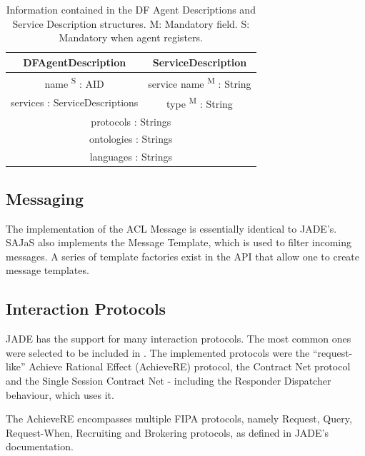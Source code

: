\begin{table}
	\normalsize
	\caption[The DF Agent Descriptions and the Service Description]{Information contained in the DF Agent Descriptions and Service Description structures.
	M: Mandatory field. S: Mandatory when agent registers.}
	\label{tab:dfAgentDescription}
	\begin{center}
		\begin{tabular}{c|c}
		\hline
		\textbf{DFAgentDescription} & \textbf{ServiceDescription} \\
		\hline
		name \textsuperscript{S} : AID & service name \textsuperscript{M} : String \\
		\hline
		services : ServiceDescriptions & type \textsuperscript{M} : String \\
		\hline
		\multicolumn{2}{c}{protocols : Strings} \\
		\hline
		\multicolumn{2}{c}{ontologies : Strings} \\
		\hline
		\multicolumn{2}{c}{languages : Strings} \\
		\hline
		\end{tabular}
	\end{center}
\end{table} 

\subsection{Messaging}
The implementation of the ACL Message is essentially identical to JADE's. SAJaS also implements the Message Template, which is used to filter incoming messages. A series of template factories exist in the API that allow one to create message templates. 

\subsection{Interaction Protocols}
JADE has the support for many interaction protocols. The most common ones were selected to be included in \apiname{}.
The implemented protocols were the ``request-like'' Achieve Rational Effect (AchieveRE) protocol, the Contract Net protocol and the Single Session Contract Net - including the Responder Dispatcher behaviour, which uses it.

The AchieveRE encompasses multiple \gls{FIPA} protocols, namely Request, Query, Request-When, Recruiting and Brokering protocols, as defined in JADE's documentation.

